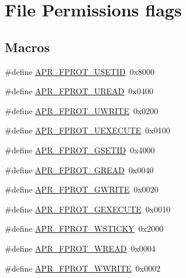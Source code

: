 \hypertarget{group__apr__file__permissions}{}\section{File Permissions flags}
\label{group__apr__file__permissions}
\subsection*{Macros}
\begin{DoxyCompactItemize}
\item 
\#define \hyperlink{group__apr__file__permissions_ga67caebf5bbe4f3f4b6252a75e5ce066f}{A\+P\+R\+\_\+\+F\+P\+R\+O\+T\+\_\+\+U\+S\+E\+T\+ID}~0x8000
\item 
\#define \hyperlink{group__apr__file__permissions_gaab6c4c2e7b95f4345c248c27b3f1a655}{A\+P\+R\+\_\+\+F\+P\+R\+O\+T\+\_\+\+U\+R\+E\+AD}~0x0400
\item 
\#define \hyperlink{group__apr__file__permissions_ga50b985779b15fbfdae0758e98ffb92af}{A\+P\+R\+\_\+\+F\+P\+R\+O\+T\+\_\+\+U\+W\+R\+I\+TE}~0x0200
\item 
\#define \hyperlink{group__apr__file__permissions_ga156e1374a4ef30e745340d8c20b36d03}{A\+P\+R\+\_\+\+F\+P\+R\+O\+T\+\_\+\+U\+E\+X\+E\+C\+U\+TE}~0x0100
\item 
\#define \hyperlink{group__apr__file__permissions_ga5fcf6746afdd4e9b8be6ceab6892a3f5}{A\+P\+R\+\_\+\+F\+P\+R\+O\+T\+\_\+\+G\+S\+E\+T\+ID}~0x4000
\item 
\#define \hyperlink{group__apr__file__permissions_ga5ad9b67b8008db3ffc56c3c2a65aa192}{A\+P\+R\+\_\+\+F\+P\+R\+O\+T\+\_\+\+G\+R\+E\+AD}~0x0040
\item 
\#define \hyperlink{group__apr__file__permissions_gacecdc9f88b04c768150418688b786500}{A\+P\+R\+\_\+\+F\+P\+R\+O\+T\+\_\+\+G\+W\+R\+I\+TE}~0x0020
\item 
\#define \hyperlink{group__apr__file__permissions_gab627bef3f9ceb84bbf00906eaeb12184}{A\+P\+R\+\_\+\+F\+P\+R\+O\+T\+\_\+\+G\+E\+X\+E\+C\+U\+TE}~0x0010
\item 
\#define \hyperlink{group__apr__file__permissions_ga989dbea02f779a5f20a643d7e4ee9952}{A\+P\+R\+\_\+\+F\+P\+R\+O\+T\+\_\+\+W\+S\+T\+I\+C\+KY}~0x2000
\item 
\#define \hyperlink{group__apr__file__permissions_ga194718630250b0f0dd4be38c86dac717}{A\+P\+R\+\_\+\+F\+P\+R\+O\+T\+\_\+\+W\+R\+E\+AD}~0x0004
\item 
\#define \hyperlink{group__apr__file__permissions_ga51692a9828f5b6288d89495378944260}{A\+P\+R\+\_\+\+F\+P\+R\+O\+T\+\_\+\+W\+W\+R\+I\+TE}~0x0002

\end{DoxyCompactItemize}
